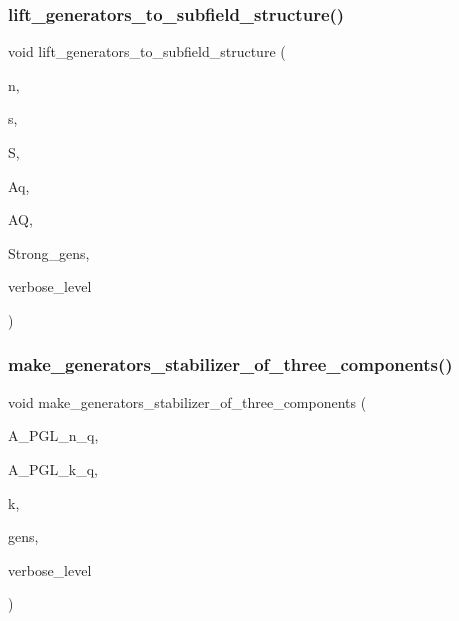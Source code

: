 \subsubsection{\texorpdfstring{lift\+\_\+generators\+\_\+to\+\_\+subfield\+\_\+structure()}{lift\_generators\_to\_subfield\_structure()}}
{\footnotesize\ttfamily void lift\+\_\+generators\+\_\+to\+\_\+subfield\+\_\+structure (\begin{DoxyParamCaption}\item[{\mbox{\hyperlink{galois_8h_a09fddde158a3a20bd2dcadb609de11dc}{I\+NT}}}]{n,  }\item[{\mbox{\hyperlink{galois_8h_a09fddde158a3a20bd2dcadb609de11dc}{I\+NT}}}]{s,  }\item[{\mbox{\hyperlink{classsubfield__structure}{subfield\+\_\+structure}} $\ast$}]{S,  }\item[{\mbox{\hyperlink{classaction}{action}} $\ast$}]{Aq,  }\item[{\mbox{\hyperlink{classaction}{action}} $\ast$}]{AQ,  }\item[{\mbox{\hyperlink{classstrong__generators}{strong\+\_\+generators}} $\ast$\&}]{Strong\+\_\+gens,  }\item[{\mbox{\hyperlink{galois_8h_a09fddde158a3a20bd2dcadb609de11dc}{I\+NT}}}]{verbose\+\_\+level }\end{DoxyParamCaption})}

\mbox{\label{action__global_8_c_a8513e31255547ed232f93c99d19ebb6a}} 
\subsubsection{\texorpdfstring{make\+\_\+generators\+\_\+stabilizer\+\_\+of\+\_\+three\+\_\+components()}{make\_generators\_stabilizer\_of\_three\_components()}}
{\footnotesize\ttfamily void make\+\_\+generators\+\_\+stabilizer\+\_\+of\+\_\+three\+\_\+components (\begin{DoxyParamCaption}\item[{\mbox{\hyperlink{classaction}{action}} $\ast$}]{A\+\_\+\+P\+G\+L\+\_\+n\+\_\+q,  }\item[{\mbox{\hyperlink{classaction}{action}} $\ast$}]{A\+\_\+\+P\+G\+L\+\_\+k\+\_\+q,  }\item[{\mbox{\hyperlink{galois_8h_a09fddde158a3a20bd2dcadb609de11dc}{I\+NT}}}]{k,  }\item[{\mbox{\hyperlink{classvector__ge}{vector\+\_\+ge}} $\ast$}]{gens,  }\item[{\mbox{\hyperlink{galois_8h_a09fddde158a3a20bd2dcadb609de11dc}{I\+NT}}}]{verbose\+\_\+level }\end{DoxyParamCaption})}

